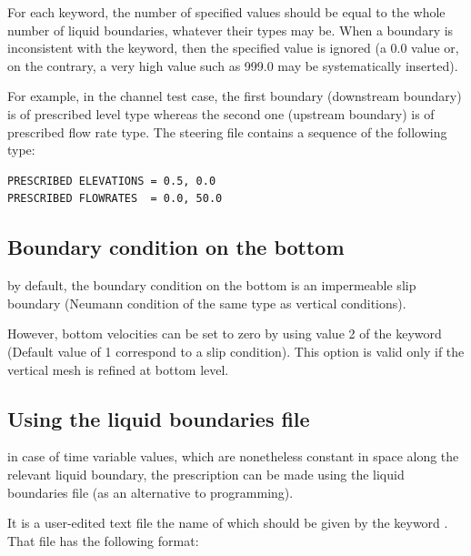 For each keyword, the number of specified values should be equal to the whole
number of liquid boundaries, whatever their types may be. When a boundary is
inconsistent with the keyword, then the specified value is ignored (a 0.0 value
or, on the contrary, a very high value such as 999.0 may be systematically
inserted).

For example, in the channel test case, the first boundary (downstream boundary)
is of prescribed level type whereas the second one (upstream boundary) is of
prescribed flow rate type. The steering file contains a sequence of the
following type:

\begin{lstlisting}[language=TelemacCas]
PRESCRIBED ELEVATIONS = 0.5, 0.0
PRESCRIBED FLOWRATES  = 0.0, 50.0
\end{lstlisting}

\subsection{Boundary condition on the bottom}

by default, the boundary condition on the bottom is an impermeable slip
boundary (Neumann condition of the same type as vertical conditions).

However, bottom velocities can be set to zero by using value 2 of the keyword
 (Default value of 1 correspond to a
slip condition). This option is valid only if the vertical mesh is refined at
bottom level.


\subsection{Using the liquid boundaries file}
\label{sec:liqbnd}
in case of time variable values, which are nonetheless constant in space along
the relevant liquid boundary, the prescription can be made using the liquid
boundaries file (as an alternative to programming).

It is a user-edited text file the name of which should be given by the keyword
. That file has the
following format:

